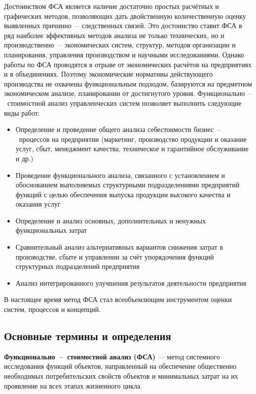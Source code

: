 Достоинством ФСА является наличие достаточно простых расчётных и графических
методов, позволяющих дать двойственную количественную оценку выявленных
причинно~--~следственных связей. Это достоинство ставит ФСА в ряд наиболее
эффективных методов анализа не только технических, но и
производственно~--~экономических систем, структур, методов организации и
планирования, управления производством и научными исследованиями. Однако работы
по ФСА проводятся в отрыве от экономических расчётов на предприятиях и в
объединениях.
Поэтому экономические нормативы действующего производства не охвачены
функциональным подходом, базируются на предметном экономическом анализе,
планировании от достигнутого уровня.
Функционально~--~стоимостной анализ управленческих систем позволяет выполнить
следующие виды работ:
\begin{itemize}
    \item Определение и проведение общего анализа себестоимости
    бизнес~--~процессов на предприятии (маркетинг, производство продукции и
    оказание услуг, сбыт, менеджмент качества, техническое и гарантийное
    обслуживание и др.)
    \item Проведение функционального анализа, связанного с установлением и
    обоснованием выполняемых структурными подразделениями предприятий функций с
    целью обеспечения выпуска продукции высокого качества и оказания услуг
    \item Определение и анализ основных, дополнительных и ненужных
    функциональных затрат
    \item Сравнительный анализ альтернативных вариантов снижения затрат в
    производстве, сбыте и управлении за счёт упорядочения функций структурных
    подразделений предприятия
    \item Анализ интегрированного улучшения результатов деятельности
предприятия
\end{itemize}

В настоящее время метод ФСА стал всеобъемлющим инструментом
оценки систем, процессов и концепций.

\newpage
\subsection{Основные термины и определения}

\textbf{Функционально~--~стоимостной анализ (ФСА)} --- метод системного
исследования функций объектов, направленный на обеспечение общественно
необходимых потребительских свойств объектов и минимальных затрат на их
проявление на всех этапах жизненного цикла.

